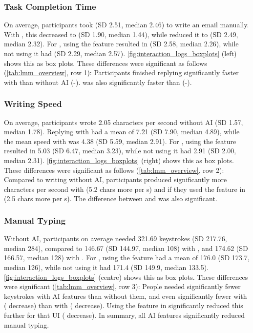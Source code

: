 \subsubsection{Task Completion Time}\label{sec:results_time}

On average, participants took  (SD 2.51, median 2.46) to write an email manually.
With \modemail, this decreased to  (SD 1.90, median 1.44), while \modeours{} reduced it to  (SD 2.49, median 2.32). For \modeours, using the \imppass{} feature resulted in  (SD 2.58, median 2.26), while not using it had  (SD 2.29, median 2.57).
\cref{fig:interaction_logs_boxplots} (left) shows this as box plots.
These differences were significant as follows (\cref{tab:lmm_overview}, row 1): 
Participants finished replying significantly faster with \modemail{} than without AI (-). \modemail{} was also significantly faster than \modeours{} (-).



\subsubsection{Writing Speed}\label{sec:results_speed}

On average, participants wrote 2.05 characters per second without AI (SD 1.57, median 1.78).
Replying with \modemail{} had a mean of 7.21 (SD 7.90, median 4.89), while the mean speed with \modeours{} was 4.38 (SD 5.59, median 2.91). For \modeours, using the \imppass{} feature resulted in 5.03 (SD 6.47, median 3.23), while not using it had 2.91 (SD 2.00, median 2.31).
\cref{fig:interaction_logs_boxplots} (right) shows this as box plots.
These differences were significant as follows (\cref{tab:lmm_overview}, row 2): 
Compared to writing without AI, participants produced significantly more characters per second with \modemail{} (5.2 chars more per s) and if they used the \imppass{} feature in \modeours{} (2.5 chars more per s). The difference between \modemail{} and \modeours{} was also significant.




\subsubsection{Manual Typing}\label{sec:results_keystrokes}
Without AI, participants on average needed 321.69 keystrokes (SD 217.76, median 284), compared to 146.67 (SD 144.97, median 108) with \modemail, and 174.62 (SD 166.57, median 128) with \modeours. For \modeours, using the \imppass{} feature had a mean of 176.0 (SD 173.7, median 126), while not using it had 171.4 (SD 149.9, median 133.5).
\cref{fig:interaction_logs_boxplots} (centre) shows this as box plots.
These differences were significant (\cref{tab:lmm_overview}, row 3): People needed significantly fewer keystrokes with AI features than without them, and even significantly fewer with \modemail{} ( decrease) than with \modeours{} ( decrease). Using the \imppass{} feature in \modeours{} significantly reduced this further for that UI ( decrease). In summary, all AI features significantly reduced manual typing.




